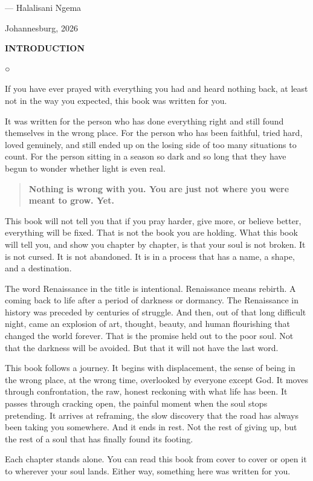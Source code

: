 --- Halalisani Ngema

Johannesburg, 2026

\textbf{INTRODUCTION}

○

If you have ever prayed with everything you had and heard nothing back,
at least not in the way you expected, this book was written for you.

It was written for the person who has done everything right and still
found themselves in the wrong place. For the person who has been
faithful, tried hard, loved genuinely, and still ended up on the losing
side of too many situations to count. For the person sitting in a season
so dark and so long that they have begun to wonder whether light is even
real.

\begin{quote}
\textbf{Nothing is wrong with you. You are just not where you were meant
to grow. Yet.}
\end{quote}

This book will not tell you that if you pray harder, give more, or
believe better, everything will be fixed. That is not the book you are
holding. What this book will tell you, and show you chapter by chapter,
is that your soul is not broken. It is not cursed. It is not abandoned.
It is in a process that has a name, a shape, and a destination.

The word Renaissance in the title is intentional. Renaissance means
rebirth. A coming back to life after a period of darkness or dormancy.
The Renaissance in history was preceded by centuries of struggle. And
then, out of that long difficult night, came an explosion of art,
thought, beauty, and human flourishing that changed the world forever.
That is the promise held out to the poor soul. Not that the darkness
will be avoided. But that it will not have the last word.

This book follows a journey. It begins with displacement, the sense of
being in the wrong place, at the wrong time, overlooked by everyone
except God. It moves through confrontation, the raw, honest reckoning
with what life has been. It passes through cracking open, the painful
moment when the soul stops pretending. It arrives at reframing, the slow
discovery that the road has always been taking you somewhere. And it
ends in rest. Not the rest of giving up, but the rest of a soul that has
finally found its footing.

Each chapter stands alone. You can read this book from cover to cover or
open it to wherever your soul lands. Either way, something here was
written for you.

